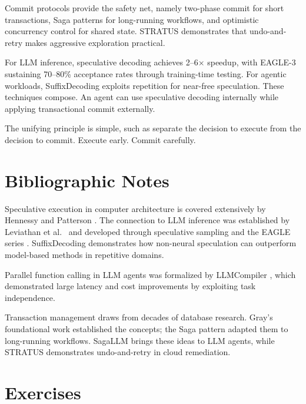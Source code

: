 Commit protocols provide the safety net, namely two-phase commit for short transactions, Saga patterns for long-running workflows, and optimistic concurrency control for shared state. STRATUS demonstrates that undo-and-retry makes aggressive exploration practical.

For LLM inference, speculative decoding achieves 2--6$\times$ speedup, with EAGLE-3 sustaining 70--80\% acceptance rates through training-time testing. For agentic workloads, SuffixDecoding exploits repetition for near-free speculation. These techniques compose. An agent can use speculative decoding internally while applying transactional commit externally.

The unifying principle is simple, such as separate the decision to execute from the decision to commit. Execute early. Commit carefully.

\section*{Bibliographic Notes}

Speculative execution in computer architecture is covered extensively by Hennessy and Patterson \cite{hennessy2017computer}. The connection to LLM inference was established by Leviathan et al.\ \cite{leviathan2023fast} and developed through speculative sampling and the EAGLE series \cite{li2024eagle, li2024eagle2, li2025eagle3}. SuffixDecoding \cite{wang2024suffixdecoding} demonstrates how non-neural speculation can outperform model-based methods in repetitive domains.

Parallel function calling in LLM agents was formalized by LLMCompiler \cite{kim2024llmcompiler}, which demonstrated large latency and cost improvements by exploiting task independence.

Transaction management draws from decades of database research. Gray’s foundational work \cite{gray1978notes} established the concepts; the Saga pattern \cite{garciamolina1987sagas} adapted them to long-running workflows. SagaLLM \cite{chang2025sagallm} brings these ideas to LLM agents, while STRATUS \cite{jha2025stratus} demonstrates undo-and-retry in cloud remediation.

\section*{Exercises}

